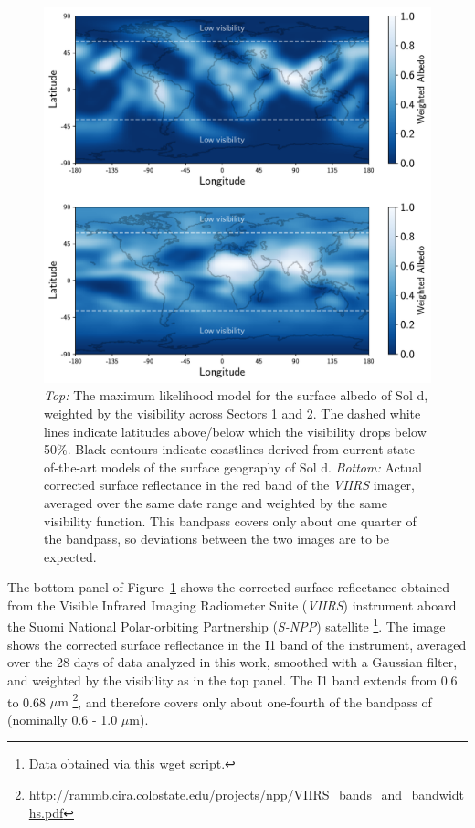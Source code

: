 \documentclass[modern]{aastex62}
\begin{document}
\begin{figure}[t!]
    \begin{centering}
    \includegraphics[width=\linewidth]{figures/map.pdf}
    \caption{\label{fig:map}
             \emph{Top:} The maximum likelihood model for the surface albedo
             of Sol d, weighted by the visibility across Sectors 1 and 2. The
             dashed white lines indicate latitudes above/below which the
             visibility drops below 50\%. Black contours indicate coastlines
             derived from current state-of-the-art models of the surface geography 
             of Sol d.
             \emph{Bottom:} Actual corrected surface reflectance in the red band of the
             \emph{VIIRS} imager, averaged over the same date range and weighted
             by the same visibility function. This bandpass covers only about one
             quarter of the \tess bandpass, so deviations between the two images
             are to be expected.
             }
    \end{centering}
\end{figure}

The bottom panel of Figure~\ref{fig:map} shows the corrected surface
reflectance obtained from the
Visible Infrared Imaging Radiometer Suite (\emph{VIIRS}) instrument aboard the 
Suomi National Polar-orbiting Partnership (\emph{S-NPP}) satellite
\footnote{Data obtained via 
\href{https://github.com/rodluger/earthshine/blob/master/tex/figures/viirs.sh}{this wget script}.}. 
The image shows the corrected surface reflectance in the I1 band of the instrument,
averaged over the 28 days of data analyzed in this work, smoothed with a Gaussian
filter, and weighted by the \tess visibility as in the top panel.
The I1 band extends from 0.6 to 0.68 $\mu\mathrm{m}$
\footnote{\url{http://rammb.cira.colostate.edu/projects/npp/VIIRS_bands_and_bandwidths.pdf}},
and therefore covers only about one-fourth of the bandpass of \tess
(nominally 0.6 - 1.0 $\mu\mathrm{m}$).
\end{document}
